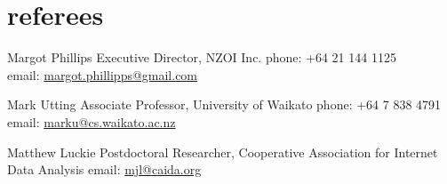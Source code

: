 \documentclass[]{boris-cv}
\begin{document}
\section{referees}

  {Margot Phillips}
  {Executive Director, NZOI Inc.}
  {phone: +64 21 144 1125
  \\email: \href{mailto:margot.phillipps@gmail.com}{margot.phillipps@gmail.com}}

  {Mark Utting}
  {Associate Professor, University of Waikato}
  {phone: +64 7 838 4791
  \\email: \href{mailto:marku@cs.waikato.ac.nz}
  {marku@cs.waikato.ac.nz}}

  {Matthew Luckie}
  {Postdoctoral Researcher,
  Cooperative Association for Internet Data Analysis}
  {email: \href{mailto:mjl@caida.org}{mjl@caida.org}}
\end{document}
